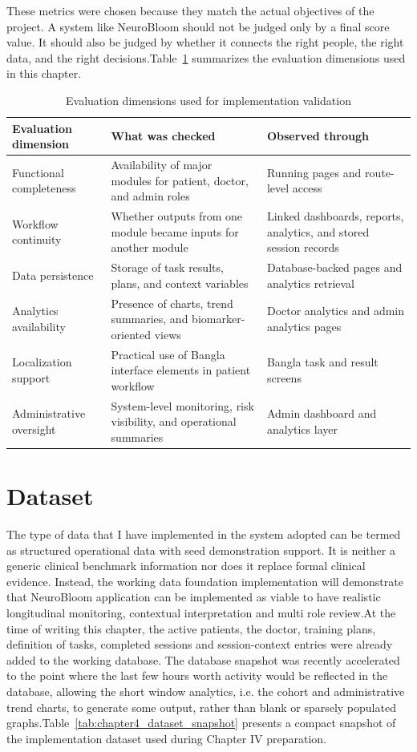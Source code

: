 \documentclass[12pt,a4paper]{report}
\begin{document}
These metrics were chosen because they match the actual objectives of the project. A system like NeuroBloom should not be judged only by a final score value. It should also be judged by whether it connects the right people, the right data, and the right decisions.Table~\ref{tab:chapter4_eval_metrics} summarizes the evaluation dimensions used in this chapter.

\begin{table}[htbp]
\centering
\caption{Evaluation dimensions used for implementation validation}
\label{tab:chapter4_eval_metrics}
\begin{tabularx}{\textwidth}{|p{4.1cm}|X|p{3.1cm}|}
\hline
\textbf{Evaluation dimension} & \textbf{What was checked} & \textbf{Observed through} \\
\hline
Functional completeness & Availability of major modules for patient, doctor, and admin roles & Running pages and route-level access \\
\hline
Workflow continuity & Whether outputs from one module became inputs for another module & Linked dashboards, reports, analytics, and stored session records \\
\hline
Data persistence & Storage of task results, plans, and context variables & Database-backed pages and analytics retrieval \\
\hline
Analytics availability & Presence of charts, trend summaries, and biomarker-oriented views & Doctor analytics and admin analytics pages \\
\hline
Localization support & Practical use of Bangla interface elements in patient workflow & Bangla task and result screens \\
\hline
Administrative oversight & System-level monitoring, risk visibility, and operational summaries & Admin dashboard and analytics layer \\
\hline
\end{tabularx}
\end{table}

\section{Dataset}
The type of data that I have implemented in the system adopted can be termed as structured operational data with seed demonstration support. It is neither a generic clinical benchmark information nor does it replace formal clinical evidence. Instead, the working data foundation implementation will demonstrate that NeuroBloom application can be implemented as viable to have realistic longitudinal monitoring, contextual interpretation and multi role review.At the time of writing this chapter, the active patients, the doctor, training plans, definition of tasks, completed sessions and session-context entries were already added to the working database. The database snapshot was recently accelerated to the point where the last few hours worth activity would be reflected in the database, allowing the short window analytics, i.e. the cohort and administrative trend charts, to generate some output, rather than blank or sparsely populated graphs.Table~\ref{tab:chapter4_dataset_snapshot} presents a compact snapshot of the implementation dataset used during Chapter IV preparation.
\end{document}
